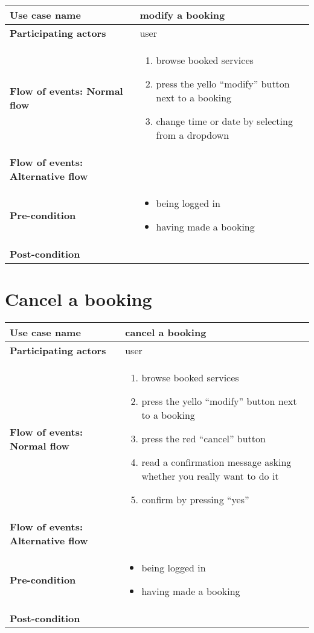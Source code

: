 \documentclass[a4paper, 13pt, draft]{report}
\begin{document}
\begin{center}
    \begin{tabular}{| >{\bf}l | p{5.55cm} |} 
	\hline
	Use case name & modify a booking \\ 
	\hline
	Participating actors & user \\
	\hline
	Flow of events: Normal flow & 
	\begin{enumerate}		
	    \item browse booked services
	    \item press the yello ``modify'' button next to a booking
	    \item change time or date by selecting from a dropdown
	\end{enumerate}	\\
	\hline
	Flow of events: Alternative flow & \notapplicable \\
	\hline
	Pre-condition & 
	\begin{itemize} 
	    \item being logged in
	    \item having made a booking
	\end{itemize} \\
	\hline
	Post-condition & \notapplicable \\
	\hline
    \end{tabular}
\end{center}

\section*{Cancel a booking}

\begin{center}
    \begin{tabular}{| >{\bf}l | p{5.55cm} |} 
	\hline
	Use case name & cancel a booking \\ 
	\hline
	Participating actors & user \\
	\hline
	Flow of events: Normal flow & 
	\begin{enumerate}		
	    \item browse booked services
	    \item press the yello ``modify'' button next to a booking
	    \item press the red ``cancel'' button
	    \item read a confirmation message asking whether you really want to do it
	    \item confirm by pressing ``yes''
	\end{enumerate}	\\
	\hline
	Flow of events: Alternative flow & \notapplicable \\
	\hline
	Pre-condition & 
	\begin{itemize} 
	    \item being logged in
	    \item having made a booking
	\end{itemize} \\
	\hline
	Post-condition & \notapplicable \\
	\hline
    \end{tabular}
\end{center}
\end{document}
